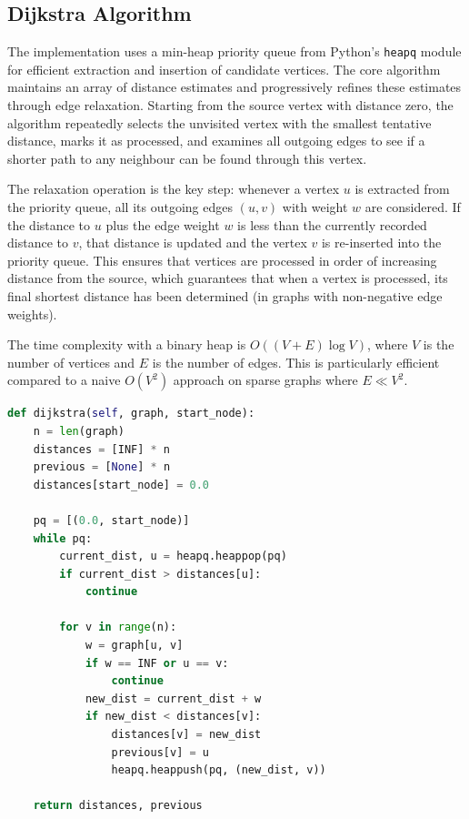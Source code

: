 \documentclass[12pt]{article}
\begin{document}
\subsection{Dijkstra Algorithm}

The implementation uses a min-heap priority queue from Python's \texttt{heapq} module
for efficient extraction and insertion of candidate vertices. The core algorithm maintains an array
of distance estimates and progressively refines these estimates through edge relaxation. Starting from
the source vertex with distance zero, the algorithm repeatedly selects the unvisited vertex with
the smallest tentative distance, marks it as processed, and examines all outgoing edges to see if
a shorter path to any neighbour can be found through this vertex.

The relaxation operation is the key step: whenever a vertex $u$ is extracted from the priority queue,
all its outgoing edges $(u,v)$ with weight $w$ are considered. If the distance to $u$ plus the edge
weight $w$ is less than the currently recorded distance to $v$, that distance is updated and the
vertex $v$ is re-inserted into the priority queue. This ensures that vertices are processed in order
of increasing distance from the source, which guarantees that when a vertex is processed, its final
shortest distance has been determined (in graphs with non-negative edge weights).

The time complexity with a binary heap is $O((V+E)\log V)$, where $V$ is the number of vertices and
$E$ is the number of edges. This is particularly efficient compared to a naive $O(V^2)$ approach on
sparse graphs where $E \ll V^2$.
\vfill
\begin{lstlisting}[language=Python, caption={Dijkstra (main.py)}, label={lst:dijkstra-py}]
def dijkstra(self, graph, start_node):
    n = len(graph)
    distances = [INF] * n
    previous = [None] * n
    distances[start_node] = 0.0

    pq = [(0.0, start_node)]
    while pq:
        current_dist, u = heapq.heappop(pq)
        if current_dist > distances[u]:
            continue

        for v in range(n):
            w = graph[u, v]
            if w == INF or u == v:
                continue
            new_dist = current_dist + w
            if new_dist < distances[v]:
                distances[v] = new_dist
                previous[v] = u
                heapq.heappush(pq, (new_dist, v))

    return distances, previous
\end{lstlisting}
\end{document}
